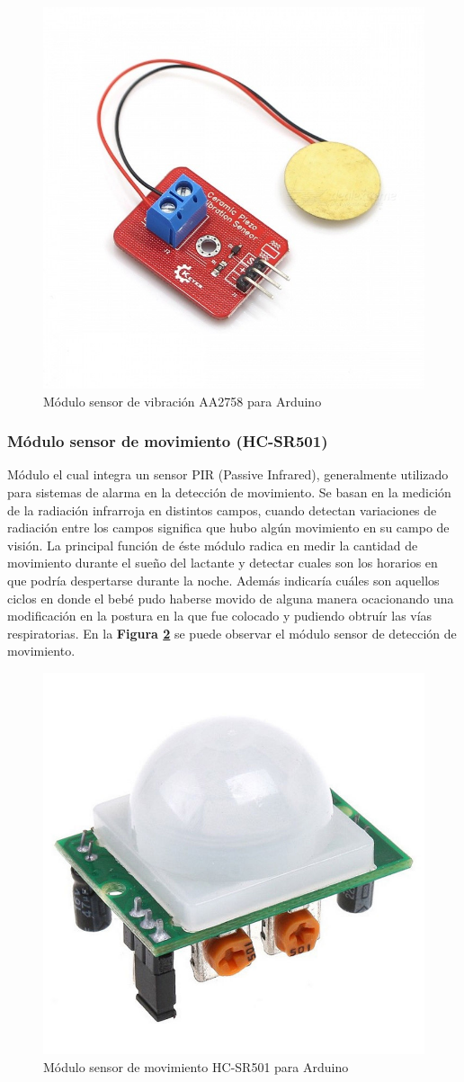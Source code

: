 \documentclass{IEEEtran}
\begin{document}
				\begin{figure}
					\centering
					\includegraphics[width=0.6\linewidth]{arduino-modulo-vibracion}
					\caption{Módulo sensor de vibración AA2758 para Arduino}
					\label{arduino-modulo-vibracion}
				\end{figure}

			\subsubsection{Módulo sensor de movimiento (\textbf{HC-SR501})}
			
			Módulo el cual integra un sensor PIR (Passive Infrared), generalmente utilizado para sistemas de alarma en la detección de movimiento. Se basan en la medición de la radiación infrarroja en distintos campos, cuando detectan variaciones de radiación entre los campos significa que hubo algún movimiento en su campo de visión. La principal función de éste módulo radica en medir la cantidad de movimiento durante el sueño del lactante y detectar cuales son los horarios en que podría despertarse durante la noche. Además indicaría cuáles son aquellos ciclos en donde el bebé pudo haberse movido de alguna manera ocacionando una modificación en la postura en la que fue colocado y pudiendo obtruír las vías respiratorias. En la \textbf{Figura \ref{arduino-modulo-movimiento}} se puede observar el módulo sensor de detección de movimiento.

				\begin{figure}
					\centering
					\includegraphics[width=0.6\linewidth]{arduino-modulo-movimiento}
					\caption{Módulo sensor de movimiento HC-SR501 para Arduino}
					\label{arduino-modulo-movimiento}
				\end{figure}
\end{document}

